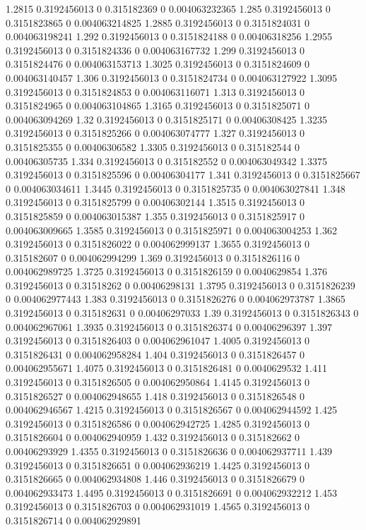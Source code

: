 {1.2815 0.3192456013 0 0.315182369 0 0.004063232365
1.285 0.3192456013 0 0.3151823865 0 0.004063214825
1.2885 0.3192456013 0 0.3151824031 0 0.004063198241
1.292 0.3192456013 0 0.3151824188 0 0.00406318256
1.2955 0.3192456013 0 0.3151824336 0 0.004063167732
1.299 0.3192456013 0 0.3151824476 0 0.004063153713
1.3025 0.3192456013 0 0.3151824609 0 0.004063140457
1.306 0.3192456013 0 0.3151824734 0 0.004063127922
1.3095 0.3192456013 0 0.3151824853 0 0.004063116071
1.313 0.3192456013 0 0.3151824965 0 0.004063104865
1.3165 0.3192456013 0 0.3151825071 0 0.004063094269
1.32 0.3192456013 0 0.3151825171 0 0.00406308425
1.3235 0.3192456013 0 0.3151825266 0 0.004063074777
1.327 0.3192456013 0 0.3151825355 0 0.00406306582
1.3305 0.3192456013 0 0.315182544 0 0.00406305735
1.334 0.3192456013 0 0.315182552 0 0.004063049342
1.3375 0.3192456013 0 0.3151825596 0 0.00406304177
1.341 0.3192456013 0 0.3151825667 0 0.004063034611
1.3445 0.3192456013 0 0.3151825735 0 0.004063027841
1.348 0.3192456013 0 0.3151825799 0 0.00406302144
1.3515 0.3192456013 0 0.3151825859 0 0.004063015387
1.355 0.3192456013 0 0.3151825917 0 0.004063009665
1.3585 0.3192456013 0 0.3151825971 0 0.004063004253
1.362 0.3192456013 0 0.3151826022 0 0.004062999137
1.3655 0.3192456013 0 0.315182607 0 0.004062994299
1.369 0.3192456013 0 0.3151826116 0 0.004062989725
1.3725 0.3192456013 0 0.3151826159 0 0.0040629854
1.376 0.3192456013 0 0.31518262 0 0.00406298131
1.3795 0.3192456013 0 0.3151826239 0 0.004062977443
1.383 0.3192456013 0 0.3151826276 0 0.004062973787
1.3865 0.3192456013 0 0.315182631 0 0.00406297033
1.39 0.3192456013 0 0.3151826343 0 0.004062967061
1.3935 0.3192456013 0 0.3151826374 0 0.00406296397
1.397 0.3192456013 0 0.3151826403 0 0.004062961047
1.4005 0.3192456013 0 0.3151826431 0 0.004062958284
1.404 0.3192456013 0 0.3151826457 0 0.004062955671
1.4075 0.3192456013 0 0.3151826481 0 0.0040629532
1.411 0.3192456013 0 0.3151826505 0 0.004062950864
1.4145 0.3192456013 0 0.3151826527 0 0.004062948655
1.418 0.3192456013 0 0.3151826548 0 0.004062946567
1.4215 0.3192456013 0 0.3151826567 0 0.004062944592
1.425 0.3192456013 0 0.3151826586 0 0.004062942725
1.4285 0.3192456013 0 0.3151826604 0 0.004062940959
1.432 0.3192456013 0 0.315182662 0 0.00406293929
1.4355 0.3192456013 0 0.3151826636 0 0.004062937711
1.439 0.3192456013 0 0.3151826651 0 0.004062936219
1.4425 0.3192456013 0 0.3151826665 0 0.004062934808
1.446 0.3192456013 0 0.3151826679 0 0.004062933473
1.4495 0.3192456013 0 0.3151826691 0 0.004062932212
1.453 0.3192456013 0 0.3151826703 0 0.004062931019
1.4565 0.3192456013 0 0.3151826714 0 0.004062929891
}
